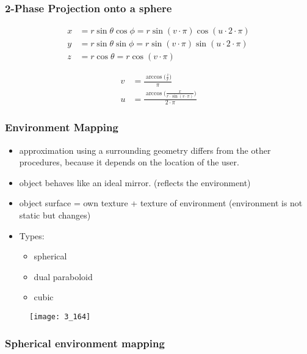 \documentclass{standalone}
\begin{document}
\subsubsection*{2-Phase Projection onto a sphere}

\begin{align}
	x &= r \sin \theta \cos \phi = r \sin (v \cdot \pi) \cos (u \cdot 2 \cdot \pi) \\
	y &= r \sin \theta \sin \phi = r \sin (v \cdot \pi) \sin (u \cdot 2 \cdot \pi) \\
	z &= r \cos \theta = r \cos (v \cdot \pi)
\end{align}

\begin{align}
	v &= \frac{\arccos \big( \frac{z}{r} \big) }{\pi} \\
	u &= \frac{\arccos \big( \frac{x}{r \cdot \sin (v \cdot \pi) } \big)}{2 \cdot \pi} 
\end{align}

\subsubsection*{Environment Mapping}

\begin{itemize}
	\item approximation using a surrounding geometry differs from the other procedures, because it depends on the location of the user.
	\item object behaves like an ideal mirror. (reflects the environment)
	\item object surface = own texture + texture of environment (environment is not static but changes) 
	\item Types:
		\begin{itemize}
			\item spherical 
			\item dual paraboloid
			\item cubic
		\end{itemize}
\end{itemize}

\begin{figure}[H]
	\texttt{[image: 3\_164]}
\end{figure} 

\subsubsection*{Spherical environment mapping}
\end{document}
